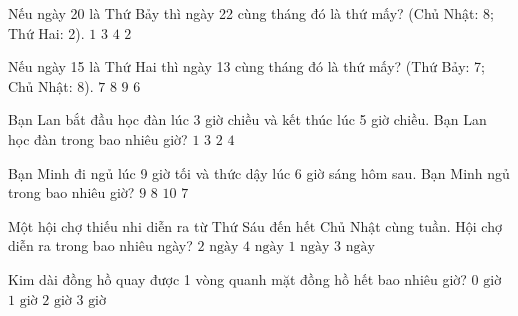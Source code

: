 \begin{ex} %
Nếu ngày 20 là Thứ Bảy thì ngày 22 cùng tháng đó là thứ mấy? (Chủ Nhật: 8; Thứ Hai: 2).
\choice
{$1$}
{$3$}
{$4$}
{\True $2$}
\end{ex}

\begin{ex} %
Nếu ngày 15 là Thứ Hai thì ngày 13 cùng tháng đó là thứ mấy? (Thứ Bảy: 7; Chủ Nhật: 8).
\choice
{$7$}
{\True $8$}
{$9$}
{$6$}
\end{ex}

\begin{ex} %
Bạn Lan bắt đầu học đàn lúc 3 giờ chiều và kết thúc lúc 5 giờ chiều. Bạn Lan học đàn trong bao nhiêu giờ?
\choice
{$1$}
{$3$}
{\True $2$}
{$4$}
\end{ex}

\begin{ex} %
Bạn Minh đi ngủ lúc 9 giờ tối và thức dậy lúc 6 giờ sáng hôm sau. Bạn Minh ngủ trong bao nhiêu giờ?
\choice
{\True $9$}
{$8$}
{$10$}
{$7$}
\end{ex}

\begin{ex} %
Một hội chợ thiếu nhi diễn ra từ Thứ Sáu đến hết Chủ Nhật cùng tuần. Hội chợ diễn ra trong bao nhiêu ngày?
\choice
{$2\text{ ngày}$}
{$4\text{ ngày}$}
{$1\text{ ngày}$}
{\True $3\text{ ngày}$}
\end{ex}

\begin{ex} %
Kim dài đồng hồ quay được 1 vòng quanh mặt đồng hồ hết bao nhiêu giờ?
\choice
{$0\text{ giờ}$}
{\True $1\text{ giờ}$}
{$2\text{ giờ}$}
{$3\text{ giờ}$}
\end{ex}


